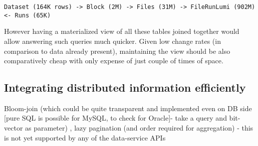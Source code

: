 \begin{verbatim}
Dataset (164K rows) -> Block (2M) -> Files (31M) -> FileRunLumi (902M) <- Runs (65K)
\end{verbatim}

However having a materialized view of all these tables joined together would allow answering such queries much quicker. Given low change rates (in comparison to data already present), maintaining the view should be also comparatively cheap with only expense of just couple of times of space.



\subsection{Integrating distributed information efficiently}
Bloom-join (which could be quite transparent and implemented even on DB side [pure SQL is possible for MySQL, to check for Oracle]- take a query and bit-vector as parameter) , lazy pagination (and order required for aggregation) - this is not yet supported by any of the data-service APIs


